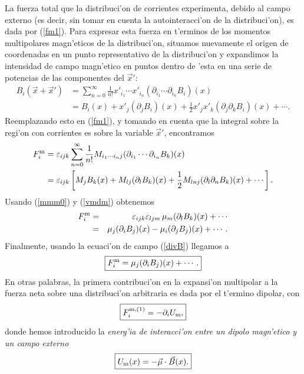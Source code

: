 La fuerza total que la distribuci'on de corrientes experimenta, debido al campo
externo (es decir, sin tomar en cuenta la autointeracci'on de la distribuci'on),
es dada por (\ref{fm1}). Para expresar esta fuerza en t'erminos de los momentos multipolares magn'eticos de la distribuci'on, situamos nuevamente el
origen de coordenadas en un punto representativo de la distribuci'on y expandimos la
intensidad de campo magn'etico en puntos dentro de 'esta en una serie
de potencias de las componentes del $\vec{x}'$:
\begin{align}
 B_i(\vec{x}+\vec{x}') &= \sum_{n=0}^\infty \frac{1}{n!}x'_{i_1}\cdots x'_{i_n}(\partial_{i_1}\cdots\partial_{i_n}B_i)(x) \label{expB} \\
 &= B_i(x)+x'_j(\partial_jB_i)(x) +
\frac{1}{2}x'_jx'_k(\partial_j\partial_kB_i)(x)+\cdots .
\end{align}
Reemplazando esto en (\ref{fm1}), y tomando en cuenta que la integral sobre la regi'on con corrientes es sobre la variable $\vec{x}'$, encontramos
\begin{align}
F^{\rm m}_i &=  \varepsilon_{ijk}\sum_{n=0}^\infty\frac{1}{n!}M_{i_1\cdots i_nj}(\partial_{i_1}\cdots\partial_{i_n}B_k)(x)\\
&= \varepsilon_{ijk}\left[M_jB_k(x)+M_{lj}(\partial_lB_k)(x)+\frac{1}{2}M_{lnj}(\partial_l\partial_nB_k)(x) +\cdots\right].
\end{align}
Usando (\ref{mmm0}) y (\ref{vmdm}) obtenemos
\begin{eqnarray}
F^{\rm m}_i
&=&\varepsilon_{ijk}\varepsilon_{ljm}\,\mu_m (\partial_lB_k)(x)+\cdots \\
&=& \mu_j(\partial_iB_j)(x)-\mu_i(\partial_jB_j)(x)+\cdots .
\end{eqnarray}
Finalmente, usando la ecuaci'on de campo (\ref{divB}) llegamos a
\begin{equation}
 \boxed{F^{\rm m}_i=\mu_j(\partial_iB_j)(x)+\cdots .}
\end{equation}
En otras palabras, la primera contribuci'on en la expansi'on multipolar a la
fuerza neta sobre una distribuci'on arbitraria es dada por el t'ermino dipolar,
con
\begin{equation}
 \boxed{F_i^{\rm m,(1)}=-\partial_i U_{\rm m}, }
\end{equation}
donde hemos introducido la \textit{energ'ia de interacci'on entre un dipolo magn'etico
y un campo externo}
\begin{equation}
 \boxed{U_{\rm m}(x)=-\vec{\mu}\cdot\vec{B}(x).} \label{Umagdip}
\end{equation}


